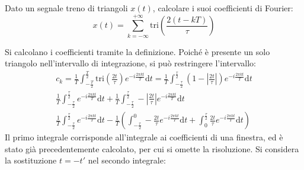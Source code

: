 \documentclass{article}
\newcommand{\tri}{\mathrm{tri}}
\newcommand{\df}{\mathrm{d}}
\begin{document}
Dato un segnale treno di triangoli $x(t)$, calcolare i suoi coefficienti di Fourier:
\begin{equation*}
    x(t)=\displaystyle\sum_{k=-\infty}^{+\infty}\tri \left(\frac{2(t-kT)}{\tau}\right)
\end{equation*}
\begin{center}
\end{center}
Si calcolano i coefficienti tramite la definizione. Poiché è presente un solo triangolo nell'intervallo di integrazione, si può restringere l'intervallo: 
\begin{gather*}
    c_k=\displaystyle\frac{1}{T}\int_{-\frac{T}{2}}^{\frac{T}{2}}\tri \left(\frac{2t}{\tau}\right)e^{-i\frac{2\pi kt}{T}}\df t=\frac{1}{T}\int_{-\frac{\tau}{2}}^{\frac{\tau}{2}}\left(1-\left|\frac{2t}{\tau}\right|\right)e^{-i\frac{2\pi kt}{T}}\df t\\
    \displaystyle\frac{1}{T}\int_{-\frac{\tau}{2}}^{\frac{\tau}{2}}e^{-i\frac{2\pi kt}{T}}\df t+\frac{1}{T}\int_{-\frac{\tau}{2}}^{\frac{\tau}{2}}-\left|\frac{2t}{\tau}\right|e^{-i\frac{2\pi kt}{T}}\df t\\
    \displaystyle\frac{1}{T}\int_{-\frac{\tau}{2}}^{\frac{\tau}{2}}e^{-i\frac{2\pi kt}{T}}\df t-\frac{1}{T}\left(\int_{-\frac{\tau}{2}}^{0}-\frac{2t}{\tau}e^{-i\frac{2\pi kt}{T}}\df t+\int_{0}^{\frac{\tau}{2}}\frac{2t}{\tau}e^{-i\frac{2\pi kt}{T}}\df t\right)
\end{gather*}
Il primo integrale corrisponde all'integrale ai coefficienti di una finestra, ed è stato già precedentemente calcolato, per cui si omette la risoluzione. Si considera la 
sostituzione $t=-t'$ nel secondo integrale:
\end{document}
